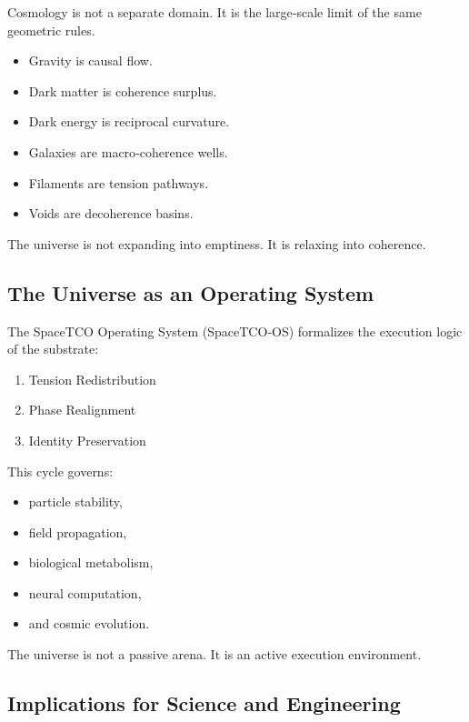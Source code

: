 \documentclass[reprint,amsmath,amssymb,aps,prl,floatfix]{revtex4-2}
\begin{document}
\begin{itemize}
Cosmology is not a separate domain.  
It is the large‑scale limit of the same geometric rules.

\begin{itemize}
\item Gravity is causal flow.  
\item Dark matter is coherence surplus.  
\item Dark energy is reciprocal curvature.  
\item Galaxies are macro‑coherence wells.  
\item Filaments are tension pathways.  
\item Voids are decoherence basins.  
\end{itemize}

The universe is not expanding into emptiness.  
It is relaxing into coherence.

\subsection{The Universe as an Operating System}

The SpaceTCO Operating System (SpaceTCO‑OS) formalizes the execution logic of the substrate:
\begin{enumerate}
\item Tension Redistribution  
\item Phase Realignment  
\item Identity Preservation
\end{enumerate}
\medskip

This cycle governs:
\begin{itemize}
\item particle stability,  
\item field propagation,  
\item biological metabolism,  
\item neural computation,  
\item and cosmic evolution.
\end{itemize}
\medskip

The universe is not a passive arena.  
It is an active execution environment.

\subsection{Implications for Science and Engineering}


\end{itemize}
\end{document}

